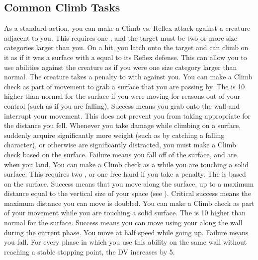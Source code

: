     \subsection{Common Climb Tasks}
         As a standard action, you can make a Climb vs. Reflex attack against a creature adjacent to you.
        This requires one , and the target must be two or more size categories larger than you.
        On a hit, you latch onto the target and can climb on it as if it was a surface with a  equal to its Reflex defense.
        This can allow you to use  abilities against the creature as if you were one size category larger than normal.
        The creature takes a  penalty to  with  against you.
         You can make a Climb check as part of movement to grab a surface that you are passing by.
        The  is 10 higher than normal for the surface if you were moving for reasons out of your control (such as if you are falling).
        Success means you grab onto the wall and interrupt your movement.
        This does not prevent you from taking  appropriate for the distance you fell.
         Whenever you take damage while climbing on a surface, suddenly acquire significantly more weight (such as by catching a falling character), or otherwise are significantly distracted, you must make a Climb check based on the surface.
        Failure means you fall off of the surface, and are \prone when you land.
         You can make a Climb check as a  while you are touching a solid surface.
        This requires two , or one free hand if you take a  penalty.
        The  is based on the surface.
        Success means that you move along the surface, up to a maximum distance equal to the vertical size of your space (see ).
        Critical success means the maximum distance you can move is doubled.
         You can make a Climb check as part of your movement while you are touching a solid surface.
        The  is 10 higher than normal for the surface.
        Success means you can move using your  along the wall during the current phase.
        You move at half speed while going up.
        Failure means you fall.
        For every phase in which you use this ability on the same wall without reaching a stable stopping point, the DV increases by 5.

